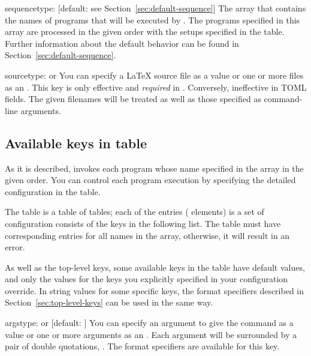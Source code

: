 \documentclass[draft]{llmk-doc}
\begin{document}
\begin{confkey}{sequence}{type: }
  [default: see Section~\ref{sec:default-sequence}]
The array that contains the names of programs that will be executed by
. The programs specified in this array are processed in the given
order with the setups specified in the  table. Further
information about the default behavior can be found in
Section~\ref{sec:default-sequence}.
\end{confkey}

\begin{confkey}{source}{type:  or }
You can specify a {\LaTeX} source file as a  value or one or more
files as an . This key is only effective and
\emph{required} in . Conversely, ineffective in TOML fields.
The given filenames will be treated as well as those specified as command-line
arguments.
\end{confkey}

\subsection{Available keys in  table}
\label{sec:keys-in-programs}

As it is described,  invokes each program whose name specified in
the  array in the given order. You can control each program
execution by specifying the detailed configuration in the 
table.

The  table is a table of tables; each of the entries (\aka
elements) is a set of configuration consists of the keys in the following list.
The  table must have corresponding entries for all names in the
 array, otherwise, it will result in an error.

As well as the top-level keys, some available keys in the  table
have default values, and only the values for the keys you explicitly specified
in your configuration override. In string values for some specific keys, the
format specifiers described in Section~\ref{sec:top-level-keys} can be used in
the same way.

\begin{confkey}{args}{type:  or }
  [default: \code{["\%T"]}]
You can specify an argument to give the command as a  value or one
or more arguments as an . Each argument will be
surrounded by a pair of double quotations, \eg {}. The format
specifiers are available for this key.
\end{confkey}
\end{document}
